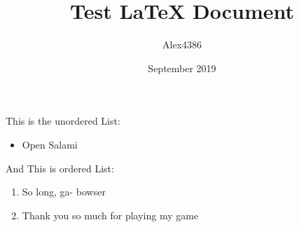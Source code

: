 \documentclass[12pt, letterpaper]{article}
\title{Test LaTeX Document}
\author{Alex4386}
\date{September 2019}
\begin{document}
\maketitle

This is the unordered List:
\begin{itemize}
    \item Open Salami
\end{itemize}

And This is ordered List:
\begin{enumerate}
    \item So long, ga- bowser
    \item Thank you so much for playing my game
\end{enumerate}
\end{document}
